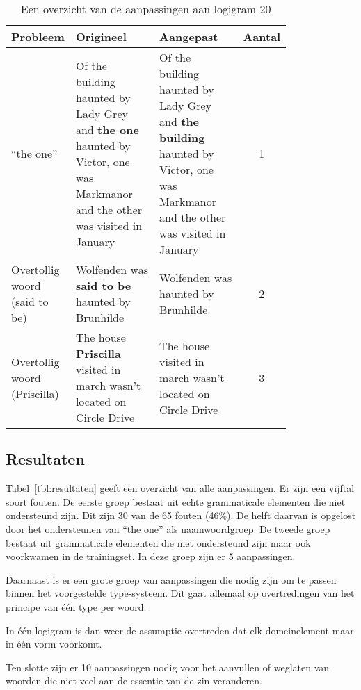 \begin{table}[h]
  \centering
  \begin{tabular}{p{0.2\linewidth}p{0.3\linewidth}p{0.3\linewidth}c}
    \toprule
    \textbf{Probleem} & \textbf{Origineel} & \textbf{Aangepast} & \textbf{Aantal} \\ 
    \hline
    ``the one'' & Of the building haunted by Lady Grey and \textbf{the one} haunted by Victor, one was Markmanor and the other was visited in January & Of the building haunted by Lady Grey and \textbf{the building} haunted by Victor, one was Markmanor and the other was visited in January & 1 \\
    \hline
    Overtollig woord (said to be) & Wolfenden was \textbf{said to be} haunted by Brunhilde & Wolfenden was haunted by Brunhilde & 2 \\
    \hline
    Overtollig woord (Priscilla) &  The house \textbf{Priscilla} visited in march wasn't located on Circle Drive & The house visited in march wasn't located on Circle Drive & 3 \\
    \bottomrule
  \end{tabular}
  \caption{Een overzicht van de aanpassingen aan logigram 20}
  \label{tbl:log20}
\end{table}

\subsection{Resultaten}
Tabel~\ref{tbl:resultaten} geeft een overzicht van alle aanpassingen. Er zijn een vijftal soort fouten. De eerste groep bestaat uit echte grammaticale elementen die niet ondersteund zijn. Dit zijn 30 van de 65 fouten (46\%). De helft daarvan is opgelost door het ondersteunen van ``the one'' als naamwoordgroep. De tweede groep bestaat uit grammaticale elementen die niet ondersteund zijn maar ook voorkwamen in de trainingset. In deze groep zijn er 5 aanpassingen.

Daarnaast is er een grote groep van aanpassingen die nodig zijn om te passen binnen het voorgestelde type-systeem. Dit gaat allemaal op overtredingen van het principe van één type per woord.

In één logigram is dan weer de assumptie overtreden dat elk domeinelement maar in één vorm voorkomt.

Ten slotte zijn er 10 aanpassingen nodig voor het aanvullen of weglaten van woorden die niet veel aan de essentie van de zin veranderen.

